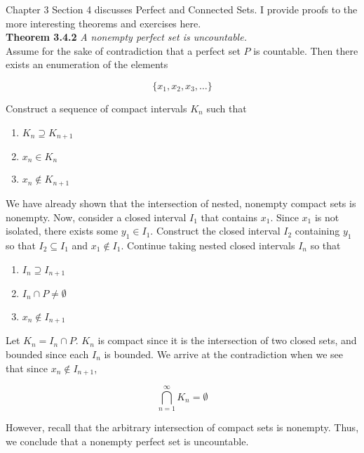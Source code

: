 \documentclass[12pt, letterpaper, twoside]{article}
\begin{document}
Chapter 3 Section 4 discusses Perfect and Connected Sets. I provide proofs to the more interesting theorems and exercises here. \\

\textbf{Theorem 3.4.2} \textit{A nonempty perfect set is uncountable.} \\

Assume for the sake of contradiction that a perfect set $P$ is countable. Then there exists an enumeration of the elements 

$$
\{x_1 , x_2, x_3, \dots \}
$$

Construct a sequence of compact intervals $K_n$ such that 


\begin{enumerate}
    \item $K_n \supseteq K_{n+1}$ 
    \item $x_n \in K_n$ 
    \item $x_n \not \in K_{n+1}$ 
\end{enumerate}

We have already shown that the intersection of nested, nonempty compact sets is nonempty. Now, consider a closed interval $I_1$ that contains $x_1$. Since $x_1$ is not isolated, there exists some $y_1 \in I_1$. Construct the closed interval $I_2$ containing $y_1$ so that $I_2 \subseteq I_1$ and $x_1 \not \in I_1$. Continue taking nested closed intervals $I_n$ so that 

\begin{enumerate}
    \item $I_n \supseteq I_{n+1}$
    \item $I_n \cap P \neq \emptyset$
    \item $x_n \not \in I_{n+1}$
\end{enumerate}

Let $K_n = I_n \cap P$. $K_n$ is compact since it is the intersection of two closed sets, and bounded since each $I_n$ is bounded. We arrive at the contradiction when we see that since $x_n \not \in I_{n+1}$, 

\begin{equation*}
    \bigcap\limits_{n=1}^{\infty} K_n = \emptyset
\end{equation*}

However, recall that the arbitrary intersection of compact sets is nonempty. Thus, we conclude that a nonempty perfect set is uncountable. \\
\end{document}
